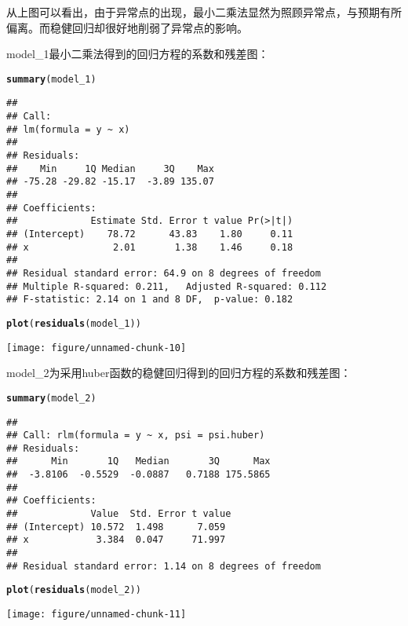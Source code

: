 \documentclass[english]{article}\usepackage[]{graphicx}\usepackage[]{color}
\makeatletter
\def\maxwidth{ %
  \ifdim\Gin@nat@width>\linewidth
    \linewidth
  \else
    \Gin@nat@width
  \fi
}
\newcommand{\hlkwd}[1]{\textcolor[rgb]{0.737,0.353,0.396}{\textbf{#1}}}%
\newenvironment{kframe}{%
 \def\at@end@of@kframe{}%
 \ifinner\ifhmode%
  \def\at@end@of@kframe{\end{minipage}}%
  \begin{minipage}{\columnwidth}%
 \fi\fi%
 \def\FrameCommand##1{\hskip\@totalleftmargin \hskip-\fboxsep
 \colorbox{shadecolor}{##1}\hskip-\fboxsep
     \hskip-\linewidth \hskip-\@totalleftmargin \hskip\columnwidth}%
 \MakeFramed {\advance\hsize-\width
   \@totalleftmargin\z@ \linewidth\hsize
   \@setminipage}}%
 {\par\unskip\endMakeFramed%
 \at@end@of@kframe}
\newenvironment{knitrout}{}{} %
\makeatother
\begin{document}
从上图可以看出，由于异常点的出现，最小二乘法显然为照顾异常点，与预期有所偏离。而稳健回归却很好地削弱了异常点的影响。

model\_1最小二乘法得到的回归方程的系数和残差图：

\begin{knitrout}
\color{fgcolor}\begin{kframe}
\begin{alltt}
\hlkwd{summary}(model_1)
\end{alltt}
\begin{verbatim}
## 
## Call:
## lm(formula = y ~ x)
## 
## Residuals:
##    Min     1Q Median     3Q    Max 
## -75.28 -29.82 -15.17  -3.89 135.07 
## 
## Coefficients:
##             Estimate Std. Error t value Pr(>|t|)
## (Intercept)    78.72      43.83    1.80     0.11
## x               2.01       1.38    1.46     0.18
## 
## Residual standard error: 64.9 on 8 degrees of freedom
## Multiple R-squared: 0.211,	Adjusted R-squared: 0.112 
## F-statistic: 2.14 on 1 and 8 DF,  p-value: 0.182
\end{verbatim}
\begin{alltt}
\hlkwd{plot}(\hlkwd{residuals}(model_1))
\end{alltt}
\end{kframe}
\texttt{[image: figure/unnamed-chunk-10]} 

\end{knitrout}


model\_2为采用huber函数的稳健回归得到的回归方程的系数和残差图：

\begin{knitrout}
\color{fgcolor}\begin{kframe}
\begin{alltt}
\hlkwd{summary}(model_2)
\end{alltt}
\begin{verbatim}
## 
## Call: rlm(formula = y ~ x, psi = psi.huber)
## Residuals:
##      Min       1Q   Median       3Q      Max 
##  -3.8106  -0.5529  -0.0887   0.7188 175.5865 
## 
## Coefficients:
##             Value  Std. Error t value
## (Intercept) 10.572  1.498      7.059 
## x            3.384  0.047     71.997 
## 
## Residual standard error: 1.14 on 8 degrees of freedom
\end{verbatim}
\begin{alltt}
\hlkwd{plot}(\hlkwd{residuals}(model_2))
\end{alltt}
\end{kframe}
\texttt{[image: figure/unnamed-chunk-11]} 

\end{knitrout}
\end{document}

